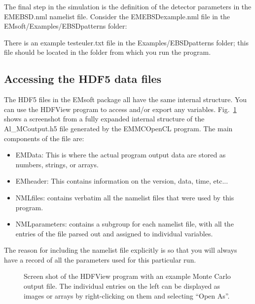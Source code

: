 \documentclass[DIV=calc, paper=letter, fontsize=11pt]{scrartcl}	 %
\begin{document}
The final step in the simulation is the definition of the detector parameters in the EMEBSD.nml namelist file.  Consider 
the EMEBSDexample.nml file in the EMsoft/Examples/EBSDpatterns folder:

There is an example testeuler.txt file in the Examples/EBSDpatterns folder; this file should be located in the
folder from which you run the program.


\subsection{Accessing the HDF5 data files}
The HDF5 files in the EMsoft package all have the same internal structure.  You can use the HDFView program to
access and/or export any variables.  Fig.~\ref{fig:hdf} shows a screenshot from a fully expanded internal structure of the Al\_MCoutput.h5
file generated by the EMMCOpenCL program.  The main components of the file are: 
\begin{itemize}
	\item EMData: This is where the actual program output data are stored as numbers, strings, or arrays.
	\item EMheader: This contains information on the version, data, time, etc...
	\item NMLfiles: contains verbatim all the namelist files that were used by this program.
	\item NMLparameters: contains a subgroup for each namelist file, with all the entries of the file parsed out and 
	assigned to individual variables.
\end{itemize}
The reason for including the namelist file explicitly is so that you will always have a record of all the parameters used 
for this particular run.

\begin{figure}[t]
\leavevmode\centering
\epsfxsize=5in
\caption{\label{fig:hdf}Screen shot of the HDFView program with an example Monte Carlo output file.  The individual entries
on the left can be displayed as images or arrays by right-clicking on them and selecting ``Open As''.}
\end{figure}
\end{document}
